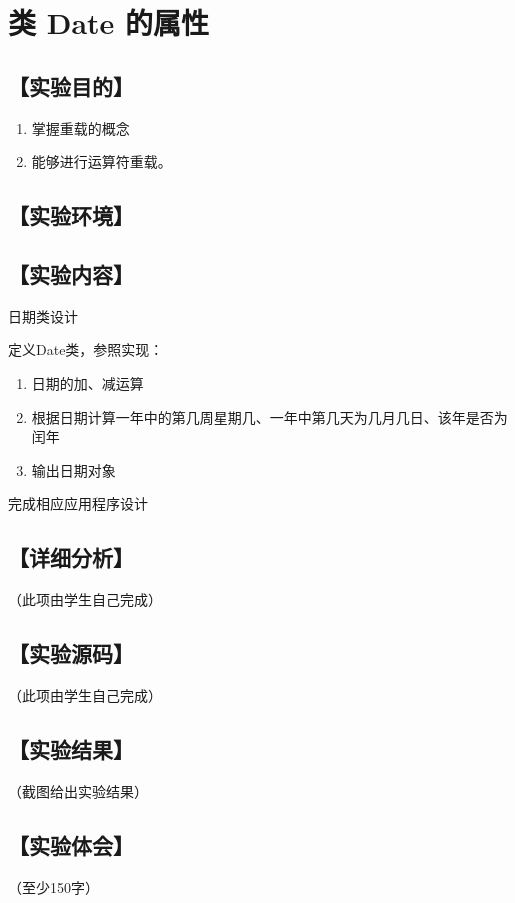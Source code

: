 \section{类 Date 的属性}
\hfill{}
\subsection*{【实验目的】}
\begin{enumerate}[topsep=0pt,partopsep=0pt,itemsep=0pt,parsep=0pt,label={\arabic*、}]
\item 掌握重载的概念
\item 能够进行运算符重载。
\end{enumerate}
\subsection*{【实验环境】}
\MyEnvironment
\subsection*{【实验内容】}
日期类设计

定义Date类，参照实现：
\begin{enumerate}[topsep=0pt,partopsep=0pt,itemsep=0pt,parsep=0pt,label={(\arabic*)}]
\item 日期的加、减运算
\item 根据日期计算一年中的第几周星期几、一年中第几天为几月几日、该年是否为闰年
\item 输出日期对象
\end{enumerate}
完成相应应用程序设计
\subsection*{【详细分析】}
（此项由学生自己完成）
\subsection*{【实验源码】}
（此项由学生自己完成）
\subsection*{【实验结果】}
（截图给出实验结果）
\subsection*{【实验体会】}
（至少150字）
